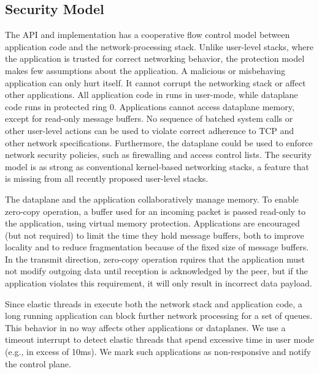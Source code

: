 \subsection{Security Model}
\label{sec:impl:coop}


The \ix API and implementation has a cooperative flow control
model between application code and the network-processing stack.
Unlike user-level stacks, where the application is trusted for correct
networking behavior, the \ix protection model makes few assumptions about the
application. A malicious or misbehaving application can only hurt
itself. It cannot corrupt the networking stack or affect other
applications. All application code in \ix runs in user-mode, while
dataplane code runs in protected ring 0. Applications cannot access
dataplane memory, except for read-only message buffers.  No sequence
of batched system calls or other user-level actions can be used to
violate correct adherence to TCP and other network specifications.
Furthermore, the dataplane could be used to enforce network security
policies, such as firewalling and access control lists.
The \ix security model is as strong as
conventional kernel-based networking stacks, a feature that is missing
from all recently proposed user-level stacks.

The \ix dataplane and the application collaboratively manage
memory. To enable zero-copy operation, a buffer used for an incoming
packet is passed read-only to the application, using virtual memory protection.
Applications are encouraged (but not required) to limit the time they hold message buffers,
both to improve locality and to reduce fragmentation because of the fixed
size of message buffers.  In the
transmit direction, zero-copy operation rquires that the application
must not modify outgoing data until reception is acknowledged by the
peer, but if the application violates this requirement, it will
only result in incorrect data payload.

Since elastic threads in \ix execute both the network stack and
application code, a long running application can block further network
processing for a set of queues. This behavior in no way affects other
applications or dataplanes. We use a timeout interrupt to detect
elastic threads that spend excessive time in user mode (e.g., in
excess of 10ms). We mark such applications as non-responsive and
notify the control plane.

